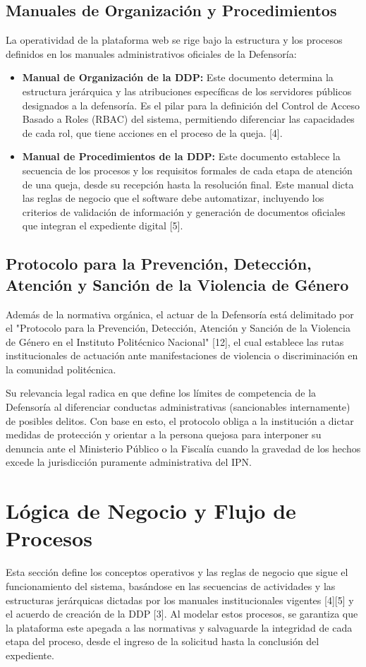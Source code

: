 \subsection{Manuales de Organización y Procedimientos}
La operatividad de la plataforma web se rige bajo la estructura y los procesos definidos en los manuales administrativos oficiales de la Defensoría:
\begin{itemize}
    \item \textbf{Manual de Organización de la DDP:} Este documento determina la estructura jerárquica y las atribuciones específicas de los servidores públicos designados a la defensoría. Es el pilar para la definición del Control de Acceso Basado a Roles (RBAC) del sistema, permitiendo diferenciar las capacidades de cada rol, que tiene acciones en el proceso de la queja. [4].
    \item \textbf{Manual de Procedimientos de la DDP:} Este documento establece la secuencia de los procesos y los requisitos formales de cada etapa de atención de una queja, desde su recepción hasta la resolución final. Este manual dicta las reglas de negocio que el software debe automatizar, incluyendo los criterios de validación de información y generación de documentos oficiales que integran el expediente digital [5].
\end{itemize}

\subsection{Protocolo para la Prevención, Detección, Atención y Sanción de la Violencia de Género}
Además de la normativa orgánica, el actuar de la Defensoría está delimitado por el "Protocolo para la Prevención, Detección, Atención y Sanción de la Violencia de Género en el Instituto Politécnico Nacional" [12], el cual establece las rutas institucionales de actuación ante manifestaciones de violencia o discriminación en la comunidad politécnica.

Su relevancia legal radica en que define los límites de competencia de la Defensoría al diferenciar conductas administrativas (sancionables internamente) de posibles delitos. Con base en esto, el protocolo obliga a la institución a dictar medidas de protección y orientar a la persona quejosa para interponer su denuncia ante el Ministerio Público o la Fiscalía cuando la gravedad de los hechos excede la jurisdicción puramente administrativa del IPN.

\section{Lógica de Negocio y Flujo de Procesos}
Esta sección define los conceptos operativos y las reglas de negocio que sigue el funcionamiento del sistema, basándose en las secuencias de actividades y las estructuras jerárquicas dictadas por los manuales institucionales vigentes [4][5] y el acuerdo de creación de la DDP [3]. Al modelar estos procesos, se garantiza que la plataforma este apegada a las normativas y salvaguarde la integridad de cada etapa del proceso, desde el ingreso de la solicitud hasta la conclusión del expediente.

